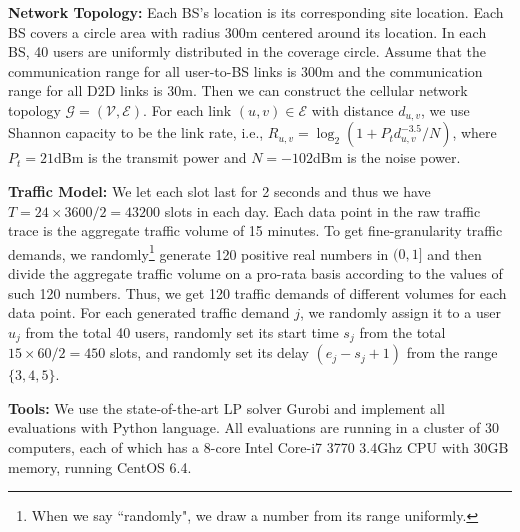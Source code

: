 \textbf{Network Topology:} Each BS's location is its corresponding site location.
Each BS covers a circle area with radius 300m centered around its location. In each BS, 40 users are uniformly distributed
in the coverage circle. Assume that the communication range for all user-to-BS links
is 300m and the communication range for all D2D links is 30m. Then we can construct the cellular network topology
$\mathcal{G}=(\mathcal{V},\mathcal{E})$.
For each link $(u,v) \in \mathcal{E}$ with distance $d_{u,v}$, we use Shannon capacity to be the link rate, i.e.,
$R_{u,v} = \log_2(1 + {P_td_{u,v}^{-3.5}}/{N})$,
where $P_t=21$dBm is the transmit power and $N=-102$dBm is the noise power.


\textbf{Traffic Model:} We let each slot last for 2 seconds and
thus we have $T=24 \times 3600 /2 = 43200$ slots in each day.
Each data point in the raw traffic trace is the aggregate traffic volume of 15 minutes.
To get fine-granularity traffic demands, we randomly\footnote{When we say ``randomly", we draw a number from its range
uniformly.} generate 120 positive real numbers in $(0,1]$ and
then divide the aggregate traffic volume on a pro-rata basis according to the values of such 120 numbers.
Thus, we get 120 traffic demands of different volumes for each data point.
For each generated traffic demand $j$, we randomly assign it to a user $u_j$ from the total 40 users,
randomly set its start time $s_j$ from the total $15\times 60/2=450$ slots, and randomly
set its delay $(e_j-s_j+1)$ from the range $\{3,4,5\}$.


\textbf{Tools:} We use the state-of-the-art LP solver Gurobi \cite{gurobi} and
implement all evaluations with Python language.
All evaluations are running in a cluster of 30 computers, each of which
has a 8-core Intel Core-i7 3770 3.4Ghz CPU with 30GB memory, running
CentOS 6.4.



%
%
%


